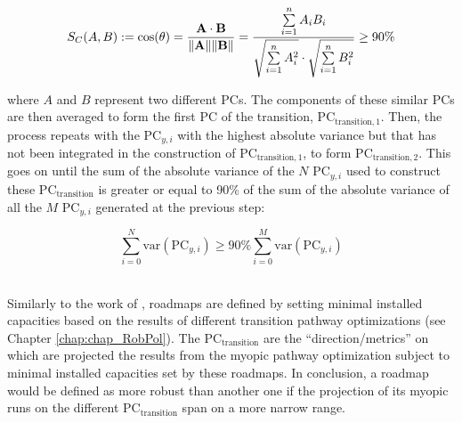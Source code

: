 \begin{equation}
\label{eq:cos_similarity}
S_C (A,B):= \cos(\theta) = {\mathbf{A} \cdot \mathbf{B} \over \|\mathbf{A}\| \|\mathbf{B}\|} = \frac{ \sum\limits_{i=1}^{n}{A_i  B_i} }{ \sqrt{\sum\limits_{i=1}^{n}{A_i^2}} \cdot \sqrt{\sum\limits_{i=1}^{n}{B_i^2}} } \geq 90\%
\end{equation}

\noindent
where $A$ and $B$ represent two different PCs.  The components of these similar PCs are then averaged to form the first PC of the transition, $\text{PC}_{\text{transition},1}$. Then, the process repeats with the $\text{PC}_{y,i}$ with the highest absolute variance but that has not been integrated in the construction of $\text{PC}_{\text{transition},1}$, to form $\text{PC}_{\text{transition},2}$. This goes on until the sum of the absolute variance of the $N$ $\text{PC}_{y,i}$ used to construct these $\text{PC}_{\text{transition}}$ is greater or equal to 90\% of the sum of the absolute variance of all the $M$ $\text{PC}_{y,i}$ generated at the previous step:

\begin{equation}
\label{eq:PC_transition}
\sum_{i=0}^N\text{var}\left(\text{PC}_{y,i}\right)\geq 90\% \sum_{i=0}^M\text{var}\left(\text{PC}_{y,i}\right)
\end{equation}


\\

\noindent
Similarly to the work of \citet{moret2020overcapacity}, roadmaps are defined by setting minimal installed capacities based on the results of different transition pathway optimizations (see Chapter \ref{chap:chap_RobPol}). The $\text{PC}_{\text{transition}}$ are the ``direction/metrics'' on which are projected the results from the myopic pathway optimization subject to minimal installed capacities set by these roadmaps.  In conclusion, a roadmap would be defined as more robust than another one if the projection of its myopic runs on the different $\text{PC}_{\text{transition}}$ span on a more narrow range.